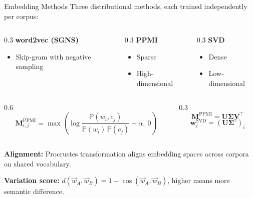 \documentclass[aspectratio=169]{beamer}
\begin{document}
\begin{frame}{Embedding Methods}
    Three distributional methods, each trained independently per corpus:

    \vspace{0.3cm}

    \begin{columns}
        \begin{column}{0.3\linewidth}
            \textbf{word2vec (SGNS)}
            \begin{itemize}
                \item Skip-gram with negative sampling
            \end{itemize}
        \end{column}
        \begin{column}{0.3\linewidth}
            \textbf{PPMI}
            \begin{itemize}
                \item Sparse
                \item High-dimensional
            \end{itemize}
        \end{column}
        \begin{column}{0.3\linewidth}
            \textbf{SVD}
            \begin{itemize}
                \item Dense
                \item Low-dimensional
            \end{itemize}
        \end{column}
    \end{columns}

    \vspace{0.3cm}

    \begin{columns}
        \begin{column}{0.6\linewidth}
            \[ \mathbf{M}^{\text{PPMI}}_{i, j} = \max\!\left(\log \frac{\mathbb{P}(w_i,c_j)}{\mathbb{P}(w_i)\,\mathbb{P}(c_j)} - \alpha,\ 0\right) \]
        \end{column}
        \begin{column}{0.3\linewidth}
            \[ \mathbf{M}^{\text{PPMI}} = \mathbf{U} \boldsymbol{\Sigma} \mathbf{V}^{\top} \]
            \[ \mathbf{w}_i^{\text{SVD}} = (\mathbf{U} \boldsymbol{\Sigma}^\gamma)_i \]
        \end{column}
    \end{columns}

    \vspace{0.3cm}

    \textbf{Alignment:} Procrustes transformation aligns embedding spaces across corpora on shared vocabulary.

    \vspace{0.1cm}

    \textbf{Variation score:} \( d(\vec{w}_A, \vec{w}_B) = 1 - \cos(\vec{w}_A, \vec{w}_B) \), higher means more semantic difference.
\end{frame}
\end{document}
